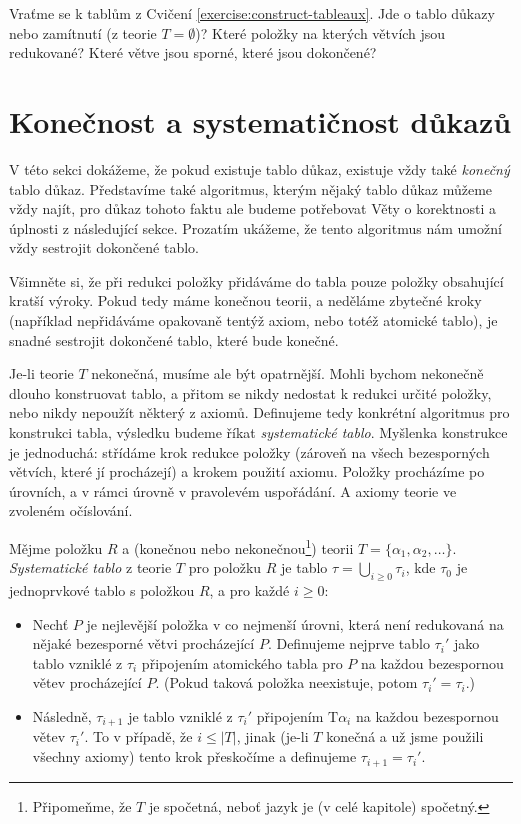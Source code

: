 \begin{exercise}
    Vraťme se k tablům z Cvičení \ref{exercise:construct-tableaux}. Jde o tablo důkazy nebo zamítnutí (z teorie $T=\emptyset$)? Které položky na kterých větvích jsou redukované? Které větve jsou sporné, které jsou dokončené?
\end{exercise}

\section{Konečnost a systematičnost důkazů}\label{section:finiteness-and-systematicity-of-proofs}

V této sekci dokážeme, že pokud existuje tablo důkaz, existuje vždy také \emph{konečný} tablo důkaz. Představíme také algoritmus, kterým nějaký tablo důkaz můžeme vždy najít, pro důkaz tohoto faktu ale budeme potřebovat Věty o korektnosti a úplnosti z následující sekce. Prozatím ukážeme, že tento algoritmus nám umožní vždy sestrojit dokončené tablo.

Všimněte si, že při redukci položky přidáváme do tabla pouze položky obsahující kratší výroky. Pokud tedy máme konečnou teorii, a neděláme zbytečné kroky (například nepřidáváme opakovaně tentýž axiom, nebo totéž atomické tablo), je snadné sestrojit dokončené tablo, které bude konečné.

Je-li teorie $T$ nekonečná, musíme ale být opatrnější. Mohli bychom nekonečně dlouho konstruovat tablo, a přitom se nikdy nedostat k redukci určité položky, nebo nikdy nepoužít některý z axiomů. Definujeme tedy konkrétní algoritmus pro konstrukci tabla, výsledku budeme říkat \emph{systematické tablo}. Myšlenka konstrukce je jednoduchá: střídáme krok redukce položky (zároveň na všech bezesporných větvích, které jí procházejí) a krokem použití axiomu. Položky procházíme po úrovních, a v rámci úrovně v pravolevém uspořádání. A axiomy teorie ve zvoleném očíslování.

\begin{definition}
Mějme položku $R$ a (konečnou nebo nekonečnou\footnote{Připomeňme, že $T$ je spočetná, neboť jazyk je (v celé kapitole) spočetný.}) teorii $T=\{\alpha_1,\alpha_2,\dots\}$. \emph{Systematické tablo} z teorie $T$ pro položku $R$ je tablo $\tau=\bigcup_{i\geq 0}\tau_i$, kde $\tau_0$ je jednoprvkové tablo s položkou $R$, a pro každé $i\geq 0$:

\begin{itemize}
    \item Nechť $P$ je nejlevější položka v co nejmenší úrovni, která není redukovaná na nějaké bezesporné větvi procházející $P$. Definujeme nejprve tablo $\tau_i'$ jako tablo vzniklé z $\tau_i$ připojením atomického tabla pro $P$ na každou bezespornou větev procházející $P$. (Pokud taková položka neexistuje, potom  $\tau_i'=\tau_i$.)
    \item Následně, $\tau_{i+1}$ je tablo vzniklé z $\tau_i'$ připojením $\mathrm{T}\alpha_i$ na každou bezespornou větev $\tau_i'$. To v případě, že $i\leq |T|$, jinak (je-li $T$ konečná a už jsme použili všechny axiomy) tento krok přeskočíme a definujeme $\tau_{i+1}=\tau_i'$.
\end{itemize}    
\end{definition}


